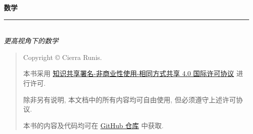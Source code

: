 \thispagestyle{empty}

\noindent\begin{minipage}{\textwidth}
  \raggedleft
  {\huge \bfseries 数学}
  \noindent\rule[-1ex]{\textwidth}{5pt}\\[2.5ex]
  \hfill\emph{\Large 更高视角下的数学}
\end{minipage}

\noindent{}


\newpage\thispagestyle{empty}
\begin{quote}\footnotesize
  Copyright \copyright{} {\the\year} Cierra Runis.

  本书采用 \href{https://creativecommons.org/licenses/by-nc-sa/4.0/deed.zh}{知识共享署名-非商业性使用-相同方式共享 4.0 国际许可协议} 进行许可.

  除非另有说明, 本文档中的所有内容均可自由使用, 但必须遵守上述许可协议.

  本书的内容及代码均可在 \href{https://github.com/Cierra-Runis/math}{GitHub 仓库} 中获取.
\end{quote}
